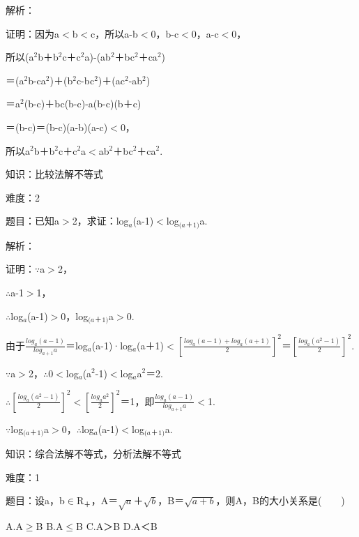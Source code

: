 \documentclass{article} %
\begin{document}
 解析：

 证明：因为a$\mathrm{<}$b$\mathrm{<}$c，所以a-b$\mathrm{<}$0，b-c$\mathrm{<}$0，a-c$\mathrm{<}$0，

所以(a${}^{2}$b＋b${}^{2}$c＋c${}^{2}$a)-(ab${}^{2}$＋bc${}^{2}$＋ca${}^{2}$)

＝(a${}^{2}$b-ca${}^{2}$)＋(b${}^{2}$c-bc${}^{2}$)＋(ac${}^{2}$-ab${}^{2}$)

＝a${}^{2}$(b-c)＋bc(b-c)-a(b-c)(b＋c)

＝(b-c)＝(b-c)(a-b)(a-c)$\mathrm{<}$0，

所以a${}^{2}$b＋b${}^{2}$c＋c${}^{2}$a$\mathrm{<}$ab${}^{2}$＋bc${}^{2}$＋ca${}^{2}$.



 知识：比较法解不等式

 难度：2

 题目：已知a$\mathrm{>}$2，求证：log${}_{a}$(a-1)$\mathrm{<}$log${}_{(a}$${}_{\textrm{＋}}$${}_{1)}$a.

 解析：

 证明：$\mathrm{\because}$a$\mathrm{>}$2，

$\mathrm{\therefore}$a-1$\mathrm{>}$1，

$\mathrm{\therefore}$log${}_{a}$(a-1)$\mathrm{>}$0，log${}_{(a}$${}_{\textrm{＋}}$${}_{1)}$a$\mathrm{>}$0.

由于$\frac{log_a(a-1)}{log_{a+1}a}$＝log${}_{a}$(a-1)·log${}_{a}$(a＋1)$\mathrm{<}$$[\frac{log_a(a-1)+log_a(a+1)}{2}]^2$＝$[\frac{log_a(a^2-1)}{2}]^2$.

$\mathrm{\because}$a$\mathrm{>}$2，$\mathrm{\therefore}$0$\mathrm{<}$log${}_{a}$(a${}^{2}$-1)$\mathrm{<}$log${}_{a}$a${}^{2}$＝2.

$\mathrm{\therefore}$$[\frac{log_a(a^2-1)}{2}]^2$$\mathrm{<}$$[\frac{log_aa^2}{2}]^2$＝1，即$\frac{log_a(a-1)}{log_{a+1}a}\mathrm{<}$1.

$\mathrm{\because}$log${}_{(a}$${}_{\textrm{＋}}$${}_{1)}$a$\mathrm{>}$0，$\mathrm{\therefore}$log${}_{a}$(a-1)$\mathrm{<}$log${}_{(a}$${}_{\textrm{＋}}$${}_{1)}$a.





 

 知识：综合法解不等式，分析法解不等式

 难度：1

 题目：设a，b$\mathrm{\in}$R${}_{\textrm{＋}}$，A＝$\sqrt{a}$＋$\sqrt{b}$，B＝$\sqrt{a+b}$，则A，B的大小关系是(　　)

A.A$\mathrm{\ge}$B  B.A$\mathrm{\le}$B  C.A＞B  D.A＜B
\end{document}
